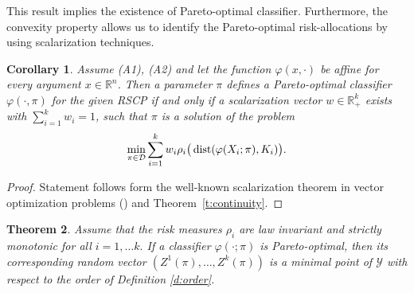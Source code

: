 \documentclass[10pt,letterpaper]{article}
\newcommand{\R}{\mathbb{R}}
\newcommand{\Dc}{\mathcal{D}}
\newcommand{\Xc}{\mathcal{X}}
\newcommand{\Yc}{\mathcal{Y}}
\newcommand{\1}{1{\hskip -2.55 pt}\hbox{I}}
\newcommand{\dist}{\mathop{\rm dist}}
\newtheorem{theorem}{Theorem}
\newtheorem{proof}{Proof}
\newtheorem{corollary}[theorem]{Corollary}
\begin{document}
This result implies the existence of Pareto-optimal classifier. Furthermore, the convexity property allows us to identify the Pareto-optimal risk-allocations by using scalarization techniques.
\begin{corollary}
\label{c:exists}
  Assume (A1), (A2) and let the function $\varphi(x,\cdot)$ be affine for every argument $x\in\R^n$. Then a parameter $\pi$ defines a Pareto-optimal classifier $\varphi(\cdot, \pi)$ for the given RSCP if and only if a scalarization vector $w\in\R^k_+$ exists with $\sum_{i=1}^k w_i=1$, such that $\pi$ is a solution of the problem
\begin{equation}
\label{scalarproblem}
\min_{\pi\in\Dc} \sum_{i=1}^k w_i\rho_i\big(\dist(\varphi(X_i;\pi),K_i)\big).
\end{equation}
\end{corollary}
\begin{proof}
Statement follows form the well-known scalarization theorem in vector optimization problems (\cite{miettinen1999nonlinear})  and Theorem~\ref{t:continuity}. %
\end{proof}
\begin{theorem}
Assume that the risk measures $\rho_i$ are law invariant and strictly monotonic for all $i=1,\dots k.$
If a classifier $\varphi(\cdot;\pi)$ is Pareto-optimal, then its corresponding random vector $(Z^1(\pi),\dots, Z^k(\pi))$ is a minimal point of $\Yc$  with respect to the order of Definition \ref{d:order}.
\end{theorem}
\end{document}
